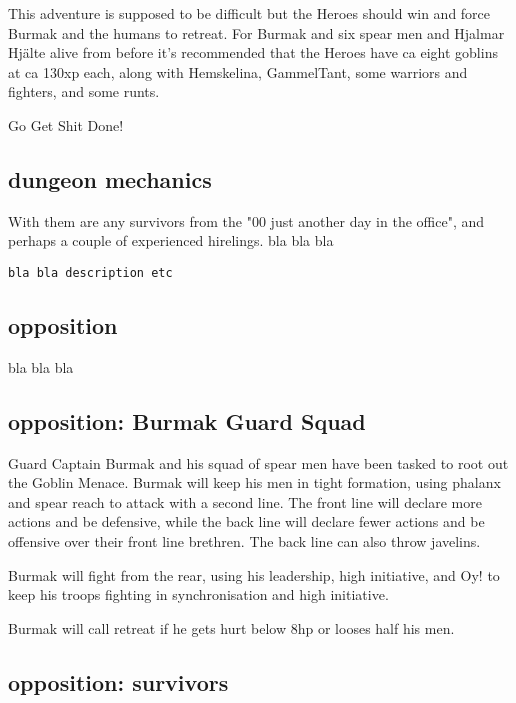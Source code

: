 This adventure is supposed to be difficult but the Heroes should win and force Burmak and the humans to retreat.
For Burmak and six spear men and Hjalmar Hjälte alive from before it's recommended that the Heroes have ca eight goblins at ca 130xp each, along with Hemskelina, GammelTant, some warriors and fighters, and some runts.

\begin{readoutloud}
Go Get Shit Done!
\end{readoutloud}


\subsection*{dungeon mechanics}

With them are any survivors from the "00 just another day in the office", and perhaps a couple of experienced hirelings.
bla bla bla

\small \begin{verbatim}
bla bla description etc
\end{verbatim} \normalsize


\subsection*{opposition}

bla bla bla


\subsection*{opposition: Burmak Guard Squad}

Guard Captain Burmak and his squad of spear men have been tasked to root out the Goblin Menace. Burmak will keep his men in tight formation, using phalanx and spear reach to attack with a second line. The front line will declare more actions and be defensive, while the back line will declare fewer actions and be offensive over their front line brethren. The back line can also throw javelins.

Burmak will fight from the rear, using his leadership, high initiative, and Oy! to keep his troops fighting in synchronisation and high initiative.

Burmak will call retreat if he gets hurt below 8hp or looses half his men.


\subsection*{opposition: survivors}

